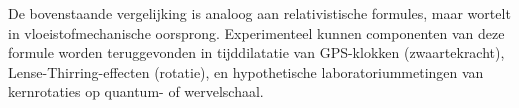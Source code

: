 De bovenstaande vergelijking is analoog aan relativistische formules, maar wortelt in vloeistofmechanische oorsprong. Experimenteel kunnen componenten van deze formule worden teruggevonden in tijddilatatie van GPS-klokken (zwaartekracht), Lense-Thirring-effecten (rotatie), en hypothetische laboratoriummetingen van kernrotaties op quantum- of wervelschaal.